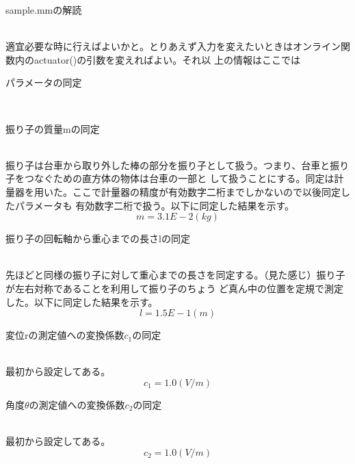 \documentclass{jarticle}
\begin{document}
\begin{enumerate}
\begin{enumerate}
\begin{enumerate}
				{\large\item sample.mmの解読}\\
				
					適宜必要な時に行えばよいかと。とりあえず入力を変えたいときはオンライン関数内のactuator()の引数を変えればよい。それ以
					上の情報はここでは\\
				
			\end{enumerate}
			{\Large\item パラメータの同定}\\
			\begin{enumerate}
				{\large\item 振り子の質量mの同定}\\
				
					振り子は台車から取り外した棒の部分を振り子として扱う。つまり、台車と振り子をつなぐための直方体の物体は台車の一部と
					して扱うことにする。同定は計量器を用いた。ここで計量器の精度が有効数字二桁までしかないので以後同定したパラメータも
					有効数字二桁で扱う。以下に同定した結果を示す。
					\begin{equation}
						m=3.1E-2(kg)
					\end{equation}
				
				{\large\item 振り子の回転軸から重心までの長さlの同定}\\
				
					先ほどと同様の振り子に対して重心までの長さを同定する。（見た感じ）振り子が左右対称であることを利用して振り子のちょう
					ど真ん中の位置を定規で測定した。以下に同定した結果を示す。
					\begin{equation}
						l=1.5E-1(m)
					\end{equation}
				
				{\large\item 変位rの測定値への変換係数$c_{1}$の同定}\\
				
					最初から設定してある。
					\begin{equation}
						c_{1}=1.0(V/m)
					\end{equation}
				
				{\large\item 角度$\theta$の測定値への変換係数$c_{2}$の同定}\\
				
					最初から設定してある。
					\begin{equation}
						c_{2}=1.0(V/m)
					\end{equation}
				

\end{enumerate}
\end{enumerate}
\end{enumerate}
\end{document}
